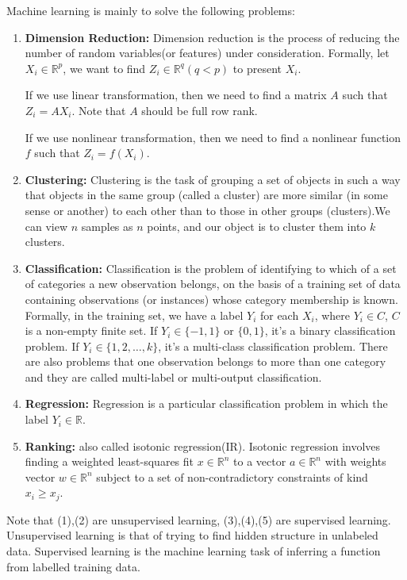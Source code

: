 \documentclass[11pt]{article}
\def\BR{{\mathbb R}}
\begin{document}
Machine learning is mainly to solve the following problems:
\begin{enumerate}[(1)]
\item 
\textbf{Dimension Reduction:}
Dimension reduction is the process of reducing the number of random variables(or features) under consideration. Formally, let $X_i \in \BR^p$, we want to find $Z_i \in \BR^q (q < p)$ to present $X_i$.

If we use linear transformation, then we need to find a matrix $A$ such that $Z_i = AX_i$. Note that $A$ should be full row rank.

If we use nonlinear transformation, then we need to find a nonlinear function $f$ such that $Z_i = f(X_i)$.
\item 
\textbf{Clustering:}
Clustering is the task of grouping a set of objects in such a way that objects in the same group (called a cluster) are more similar (in some sense or another) to each other than to those in other groups (clusters).We can view $n$ samples as $n$ points, and our object is to cluster them into $k$ clusters.
\item 
\textbf{Classification:}
Classification is the problem of identifying to which of a set of categories a new observation belongs, on the basis of a training set of data containing observations (or instances) whose category membership is known. Formally, in the training set, we have a label $Y_i$ for each $X_i$, where $Y_i \in C$, $C$ is a non-empty finite set. If $Y_i \in \{-1, 1\}$ or $\{0, 1\}$, it's a binary classification problem. If $Y_i \in \{1, 2, \dots, k\}$, it's a multi-class classification problem. There are also problems that one observation belongs to more than one category and they are called multi-label or multi-output classification.
\item 
\textbf{Regression:}
Regression is a particular classification problem in which the label $Y_i \in \BR$.
\item 
\textbf{Ranking:}
also called isotonic regression(IR). Isotonic regression involves finding a weighted least-squares fit $x \in \BR^n $ to a vector $a \in \BR^n$ with weights vector $w \in \BR^n$ subject to a set of non-contradictory constraints of kind $x_i \geq x_j$.
\end{enumerate}

Note that (1),(2) are unsupervised learning, (3),(4),(5) are supervised learning. Unsupervised learning is that of trying to find hidden structure in unlabeled data. Supervised learning is the machine learning task of inferring a function from labelled training data. 
\end{document}
